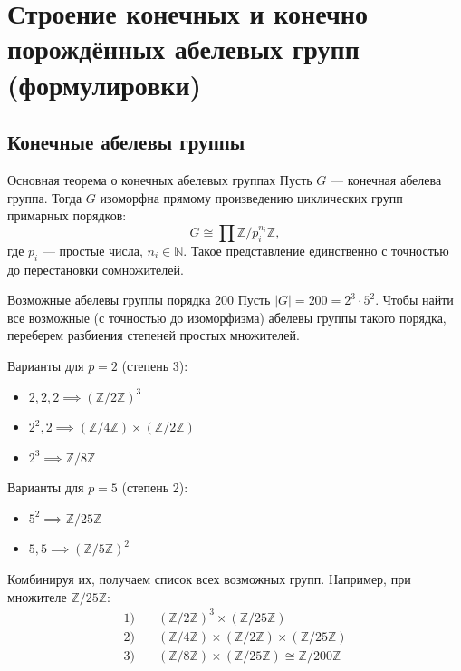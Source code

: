 
\section{Строение конечных и конечно порождённых абелевых групп (формулировки)}

\subsection{Конечные абелевы группы}

\begin{Theorem}{Основная теорема о конечных абелевых группах}{}
	Пусть $G$ --- конечная абелева группа.
	Тогда $G$ изоморфна прямому произведению циклических групп примарных порядков:
	\[
	G \cong \prod \mathbb{Z}/p_i^{n_i}\mathbb{Z},
	\]
	где $p_i$ --- простые числа, $n_i \in \mathbb{N}$.
	Такое представление единственно с точностью до перестановки сомножителей.
\end{Theorem}

\begin{Example}{Возможные абелевы группы порядка 200}{}
	Пусть $|G| = 200 = 2^3 \cdot 5^2$.
	Чтобы найти все возможные (с точностью до изоморфизма) абелевы группы такого порядка, переберем разбиения степеней простых множителей.

	Варианты для $p=2$ (степень 3):
	\begin{itemize}
		\item $2, 2, 2 \implies (\mathbb{Z}/2\mathbb{Z})^3$ 
		\item $2^2, 2 \implies (\mathbb{Z}/4\mathbb{Z}) \times (\mathbb{Z}/2\mathbb{Z})$ 
		\item $2^3 \implies \mathbb{Z}/8\mathbb{Z}$ 
	\end{itemize}

	Варианты для $p=5$ (степень 2):
	\begin{itemize}
		\item $5^2 \implies \mathbb{Z}/25\mathbb{Z}$ 
		\item $5, 5 \implies (\mathbb{Z}/5\mathbb{Z})^2$ 
	\end{itemize}

	Комбинируя их, получаем список всех возможных групп.
	Например, при множителе $\mathbb{Z}/25\mathbb{Z}$:
	\begin{align*}
		1) \quad & (\mathbb{Z}/2\mathbb{Z})^3 \times (\mathbb{Z}/25\mathbb{Z}) \\
		2) \quad & (\mathbb{Z}/4\mathbb{Z}) \times (\mathbb{Z}/2\mathbb{Z}) \times (\mathbb{Z}/25\mathbb{Z}) \\
		3) \quad & (\mathbb{Z}/8\mathbb{Z}) \times (\mathbb{Z}/25\mathbb{Z}) \cong \mathbb{Z}/200\mathbb{Z}
	\end{align*}
\end{Example}

